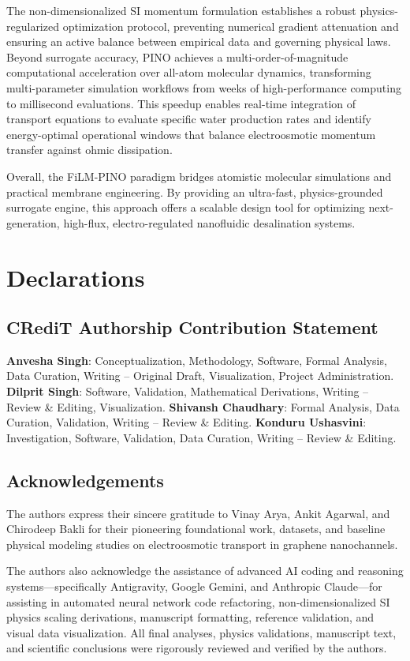 \documentclass[3p,preprint,12pt,numbers,square,sort&compress]{elsarticle}
\begin{document}
The non-dimensionalized SI momentum formulation establishes a robust physics-regularized optimization protocol, preventing numerical gradient attenuation and ensuring an active balance between empirical data and governing physical laws. Beyond surrogate accuracy, PINO achieves a multi-order-of-magnitude computational acceleration over all-atom molecular dynamics, transforming multi-parameter simulation workflows from weeks of high-performance computing to millisecond evaluations. This speedup enables real-time integration of transport equations to evaluate specific water production rates and identify energy-optimal operational windows that balance electroosmotic momentum transfer against ohmic dissipation.

Overall, the FiLM-PINO paradigm bridges atomistic molecular simulations and practical membrane engineering. By providing an ultra-fast, physics-grounded surrogate engine, this approach offers a scalable design tool for optimizing next-generation, high-flux, electro-regulated nanofluidic desalination systems.

\section*{Declarations}

\subsection*{CRediT Authorship Contribution Statement}
\textbf{Anvesha Singh}: Conceptualization, Methodology, Software, Formal Analysis, Data Curation, Writing – Original Draft, Visualization, Project Administration. \textbf{Dilprit Singh}: Software, Validation, Mathematical Derivations, Writing – Review \& Editing, Visualization. \textbf{Shivansh Chaudhary}: Formal Analysis, Data Curation, Validation, Writing – Review \& Editing. \textbf{Konduru Ushasvini}: Investigation, Software, Validation, Data Curation, Writing – Review \& Editing.

\subsection*{Acknowledgements}
The authors express their sincere gratitude to Vinay Arya, Ankit Agarwal, and Chirodeep Bakli for their pioneering foundational work, datasets, and baseline physical modeling studies on electroosmotic transport in graphene nanochannels.

The authors also acknowledge the assistance of advanced AI coding and reasoning systems---specifically Antigravity, Google Gemini, and Anthropic Claude---for assisting in automated neural network code refactoring, non-dimensionalized SI physics scaling derivations, manuscript formatting, reference validation, and visual data visualization. All final analyses, physics validations, manuscript text, and scientific conclusions were rigorously reviewed and verified by the authors.
\end{document}
